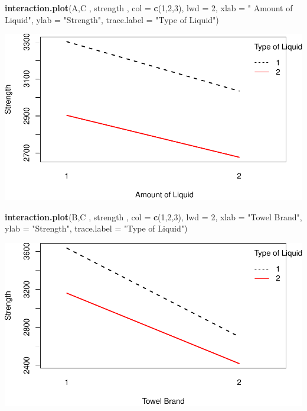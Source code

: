 \documentclass[12pt,]{article}
\newenvironment{Shaded}{\begin{snugshade}}{\end{snugshade}}
\newcommand{\KeywordTok}[1]{\textcolor[rgb]{0.13,0.29,0.53}{\textbf{#1}}}
\newcommand{\DataTypeTok}[1]{\textcolor[rgb]{0.13,0.29,0.53}{#1}}
\newcommand{\DecValTok}[1]{\textcolor[rgb]{0.00,0.00,0.81}{#1}}
\newcommand{\StringTok}[1]{\textcolor[rgb]{0.31,0.60,0.02}{#1}}
\newcommand{\NormalTok}[1]{#1}
\begin{document}
\begin{Shaded}
\begin{Highlighting}[]
\KeywordTok{interaction.plot}\NormalTok{(A,C , strength , }\DataTypeTok{col =} \KeywordTok{c}\NormalTok{(}\DecValTok{1}\NormalTok{,}\DecValTok{2}\NormalTok{,}\DecValTok{3}\NormalTok{), }\DataTypeTok{lwd =} \DecValTok{2}\NormalTok{, }\DataTypeTok{xlab =} \StringTok{" Amount of Liquid"}\NormalTok{,}
                 \DataTypeTok{ylab =} \StringTok{"Strength"}\NormalTok{, }\DataTypeTok{trace.label =} \StringTok{"Type of Liquid"}\NormalTok{)}
\end{Highlighting}
\end{Shaded}

\includegraphics{Markdown_HW_7_files/figure-latex/unnamed-chunk-2-2.pdf}

\begin{Shaded}
\begin{Highlighting}[]
\KeywordTok{interaction.plot}\NormalTok{(B,C , strength , }\DataTypeTok{col =} \KeywordTok{c}\NormalTok{(}\DecValTok{1}\NormalTok{,}\DecValTok{2}\NormalTok{,}\DecValTok{3}\NormalTok{), }\DataTypeTok{lwd =} \DecValTok{2}\NormalTok{, }\DataTypeTok{xlab =} \StringTok{"Towel Brand"}\NormalTok{,}
                 \DataTypeTok{ylab =} \StringTok{"Strength"}\NormalTok{, }\DataTypeTok{trace.label =} \StringTok{"Type of Liquid"}\NormalTok{)}
\end{Highlighting}
\end{Shaded}

\includegraphics{Markdown_HW_7_files/figure-latex/unnamed-chunk-2-3.pdf}
\end{document}
